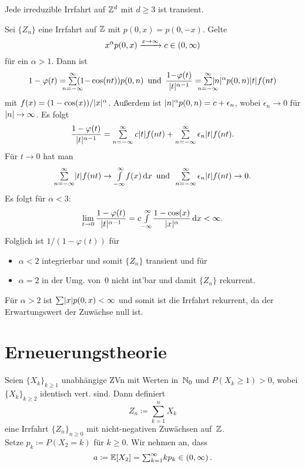 \documentclass{cheat-sheet}
\newcommand{\E}{\mathbb{E}} %
\begin{document}
\begin{satz}
  Jede irreduzible Irrfahrt auf $\mathbb{Z}^d$ mit $d \geq 3$ ist transient.
\end{satz}

\begin{bsp}
  Sei $\{ Z_n \}$ eine Irrfahrt auf $\mathbb{Z}$ mit $p(0, x) = p(0, -x)$.
  Gelte
  \[ x^\alpha p(0, x) \xrightarrow{x \to \infty} c \in \left( 0, \infty \right) \]
  für ein $\alpha > 1$.
  Dann ist
  \[
    1 - \varphi(t) = \sum_{\mathclap{n=-\infty}}^\infty (1{-}\cos(nt)) p(0, n)
    \enspace \text{und} \enspace
    \frac{1 {-} \varphi(t)}{\abs{t}^{\alpha - 1}} = \sum_{\mathclap{n=-\infty}}^\infty \abs{n}^\alpha p(0, n) \abs{t} f(n t)
  \]
  mit $f(x) = (1 - \cos(x))/\lvert x\rvert^\alpha$.
  Außerdem ist $\lvert n\rvert^\alpha p(0, n) = c + \epsilon_n$, wobei $\epsilon_n \to 0$ für $\lvert n\rvert \to \infty$.
  Es folgt
  \[
    \frac{1 - \varphi(t)}{\abs{t}^{\alpha - 1}} = \sum_{n=-\infty}^\infty c \abs{t} f(n t) + \sum_{n=-\infty}^\infty \epsilon_n \abs{t} f(n t).
  \]
  Für $t \to 0$ hat man
  \[
    \sum_{n=-\infty}^\infty \abs{t} f(n t) \to \Int{-\infty}{\infty}{f(x)}{x}
    \enspace \text{und} \enspace
    \sum_{n=-\infty}^\infty \epsilon_n \abs{t} f(n t) \to 0.
  \]
  Es folgt für $\alpha < 3$:
  \[ \lim_{t \to 0} \frac{1 - \varphi(t)}{\lvert t\rvert^{\alpha - 1}} = c {\textstyle \int\limits_{-\infty}^{\infty}} \frac{1 - \cos(x)}{\lvert x\rvert^\alpha} \,\mathrm{d} x < \infty. \]
  Folglich ist $1/(1 - \varphi(t))$ für
  \begin{itemize}
    \item $\alpha < 2$ integrierbar und somit $\{ Z_n \}$ transient und für
    \item $\alpha = 2$ in der Umg. von~0 nicht int'bar und damit $\{ Z_n \}$ rekurrent.
  \end{itemize}
  Für $\alpha > 2$ ist $\sum \abs{x} p(0, x) < \infty$ und somit ist die Irrfahrt rekurrent, da der Erwartungswert der Zuwächse null ist.
\end{bsp}


\section{Erneuerungstheorie}

\begin{situation}
  Seien $\{ X_k \}_{k \geq 1}$ unabhängige ZVn mit Werten in~$\mathbb{N}_0$ und $P(X_k \geq 1) > 0$, wobei $\{ X_k \}_{k \geq 2}$ identisch vert. sind.
  Dann definiert
  \[
    Z_n \coloneqq {\sum}_{k=1}^n X_k
  \]
  eine Irrfahrt $\{ Z_n \}_{n \geq 0}$ mit nicht-negativen Zuwächsen auf~$\mathbb{Z}$. \\
  Setze $p_k \coloneqq P(X_2 = k)$ für $k \geq 0$.
  Wir nehmen an, dass
  \[ a \coloneqq \E[X_2] = {\sum}_{k=1}^\infty k p_k \in \ointerval{0}{\infty}. \]
\end{situation}
\end{document}
